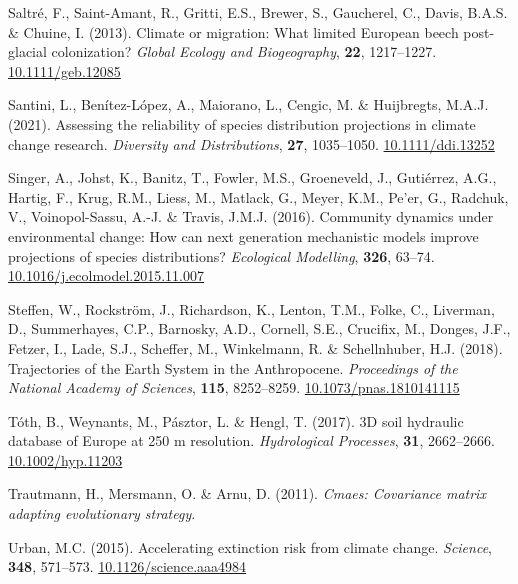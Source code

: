 \documentclass[11pt,]{article}
\newlength{\cslhangindent}
\newenvironment{CSLReferences}[2] %
 {%
  \setlength{\parindent}{0pt}
  \ifodd #1 \everypar{\setlength{\hangindent}{\cslhangindent}}\ignorespaces\fi
  \ifnum #2 > 0
  \setlength{\parskip}{#2\baselineskip}
  \fi
 }%
 {}
\begin{document}
\begin{CSLReferences}{1}{0}
\leavevmode{}%
Saltré, F., Saint-Amant, R., Gritti, E.S., Brewer, S., Gaucherel, C.,
Davis, B.A.S. \& Chuine, I. (2013). Climate or migration: What limited
{European} beech post-glacial colonization? \emph{Global Ecology and
Biogeography}, \textbf{22}, 1217--1227.
\href{https://doi.org/10.1111/geb.12085}{10.1111/geb.12085}

\leavevmode{}%
Santini, L., Benítez-López, A., Maiorano, L., Cengic, M. \& Huijbregts,
M.A.J. (2021). Assessing the reliability of species distribution
projections in climate change research. \emph{Diversity and
Distributions}, \textbf{27}, 1035--1050.
\href{https://doi.org/10.1111/ddi.13252}{10.1111/ddi.13252}

\leavevmode{}%
Singer, A., Johst, K., Banitz, T., Fowler, M.S., Groeneveld, J.,
Gutiérrez, A.G., Hartig, F., Krug, R.M., Liess, M., Matlack, G., Meyer,
K.M., Pe'er, G., Radchuk, V., Voinopol-Sassu, A.-J. \& Travis, J.M.J.
(2016). Community dynamics under environmental change: {How} can next
generation mechanistic models improve projections of species
distributions? \emph{Ecological Modelling}, \textbf{326}, 63--74.
\href{https://doi.org/10.1016/j.ecolmodel.2015.11.007}{10.1016/j.ecolmodel.2015.11.007}

\leavevmode{}%
Steffen, W., Rockström, J., Richardson, K., Lenton, T.M., Folke, C.,
Liverman, D., Summerhayes, C.P., Barnosky, A.D., Cornell, S.E.,
Crucifix, M., Donges, J.F., Fetzer, I., Lade, S.J., Scheffer, M.,
Winkelmann, R. \& Schellnhuber, H.J. (2018). Trajectories of the {Earth}
{System} in the {Anthropocene}. \emph{Proceedings of the National
Academy of Sciences}, \textbf{115}, 8252--8259.
\href{https://doi.org/10.1073/pnas.1810141115}{10.1073/pnas.1810141115}

\leavevmode{}%
Tóth, B., Weynants, M., Pásztor, L. \& Hengl, T. (2017). {3D} soil
hydraulic database of {Europe} at 250 m resolution. \emph{Hydrological
Processes}, \textbf{31}, 2662--2666.
\href{https://doi.org/10.1002/hyp.11203}{10.1002/hyp.11203}

\leavevmode{}%
Trautmann, H., Mersmann, O. \& Arnu, D. (2011). \emph{Cmaes: Covariance
matrix adapting evolutionary strategy}.

\leavevmode{}%
Urban, M.C. (2015). Accelerating extinction risk from climate change.
\emph{Science}, \textbf{348}, 571--573.
\href{https://doi.org/10.1126/science.aaa4984}{10.1126/science.aaa4984}


\end{CSLReferences}
\end{document}
